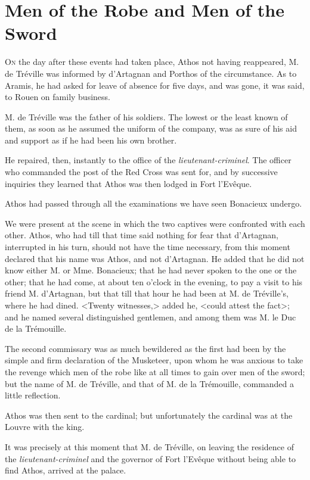 
\chapter{Men of the Robe and Men of the Sword}

\lettrine[]{O}{n} the day after these events had taken place, Athos not having reappeared, M. de Tréville was informed by d'Artagnan and Porthos of the circumstance. As to Aramis, he had asked for leave of absence for five days, and was gone, it was said, to Rouen on family business. 

M. de Tréville was the father of his soldiers. The lowest or the least known of them, as soon as he assumed the uniform of the company, was as sure of his aid and support as if he had been his own brother. 

He repaired, then, instantly to the office of the \textit{lieutenant-criminel}. The officer who commanded the post of the Red Cross was sent for, and by successive inquiries they learned that Athos was then lodged in Fort l'Evêque. 

Athos had passed through all the examinations we have seen Bonacieux undergo. 

We were present at the scene in which the two captives were confronted with each other. Athos, who had till that time said nothing for fear that d'Artagnan, interrupted in his turn, should not have the time necessary, from this moment declared that his name was Athos, and not d'Artagnan. He added that he did not know either M. or Mme. Bonacieux; that he had never spoken to the one or the other; that he had come, at about ten o'clock in the evening, to pay a visit to his friend M. d'Artagnan, but that till that hour he had been at M. de Tréville's, where he had dined. <Twenty witnesses,> added he, <could attest the fact>; and he named several distinguished gentlemen, and among them was M. le Duc de la Trémouille. 

The second commissary was as much bewildered as the first had been by the simple and firm declaration of the Musketeer, upon whom he was anxious to take the revenge which men of the robe like at all times to gain over men of the sword; but the name of M. de Tréville, and that of M. de la Trémouille, commanded a little reflection. 

Athos was then sent to the cardinal; but unfortunately the cardinal was at the Louvre with the king. 

It was precisely at this moment that M. de Tréville, on leaving the residence of the \textit{lieutenant-criminel} and the governor of Fort l'Evêque without being able to find Athos, arrived at the palace. 

